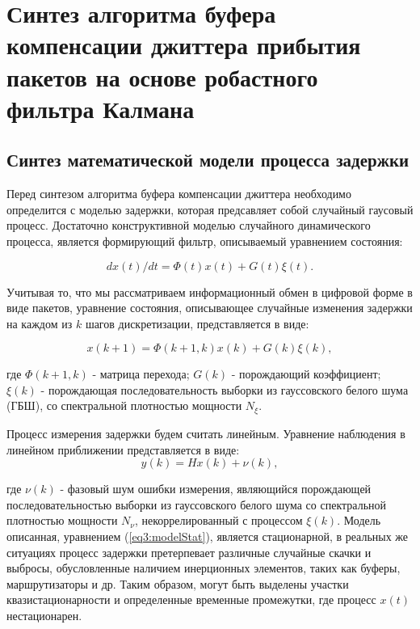 \chapter{Синтез алгоритма буфера компенсации джиттера прибытия пакетов на основе робастного фильтра Калмана} \label{chapt3}

\section{Синтез математической модели процесса задержки} \label{sect3_1}
Перед синтезом алгоритма буфера компенсации джиттера необходимо определится с моделью задержки, которая предсавляет собой случайный гаусовый процесс. Достаточно конструктивной моделью случайного динамического процесса, является формирующий фильтр, описываемый уравнением состояния:

\begin{equation}\label{eq3:modelStatDif}
dx(t)/dt=\Phi(t)x(t)+G(t)\xi(t).
\end{equation}

Учитывая то, что мы рассматриваем информационный обмен в цифровой форме в виде пакетов, уравнение состояния, описывающее случайные изменения задержки на каждом из $k$ шагов дискретизации, представляется в виде:

\begin{equation}\label{eq3:modelStat}
x(k+1)=\Phi(k+1,k)x(k)+G(k)\xi(k),
\end{equation}

\noindent где $\Phi(k+1,k)$ - матрица перехода; $G(k)$ - порождающий коэффициент; $\xi(k)$ - порождающая последовательность выборки из гауссовского белого шума (ГБШ), со спектральной плотностью мощности $N_\xi$.

Процесс измерения задержки будем считать линейным. Уравнение наблюдения в линейном приближении представляется в виде:
\begin{equation}\label{eq3:Estim}
y(k)=Hx(k)+\nu(k),
\end{equation}

\noindent где $\nu(k)$ - фазовый шум ошибки измерения, являющийся порождающей последовательностью выборки из гауссовского белого шума со спектральной плотностью мощности $N_\nu$, некоррелированный с процессом $\xi(k)$. 
Модель описанная, уравнением (\ref{eq3:modelStat}), является стационарной, в реальных же ситуациях процесс задержки претерпевает различные случайные скачки и выбросы, обусловленные наличием инерционных элементов, таких как буферы, маршрутизаторы и др. Таким образом, могут быть выделены участки квазистационарности и определенные временные промежутки, где процесс $x(t)$ нестационарен.

